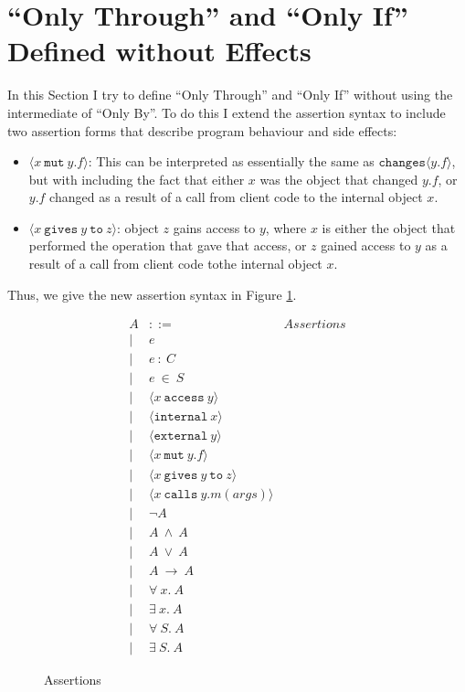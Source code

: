 \documentclass[12pt]{article}
\newcommand\mut[3]{#1\ \texttt{mut}\ #2.#3}
\newcommand\gives[3]{#1\ \texttt{gives}\ #2\ \texttt{to}\ #3}
\begin{document}
\section{``Only Through'' and ``Only If'' Defined without Effects}

In this Section I try to define ``Only Through'' and ``Only If'' without using the intermediate of ``Only By''.
To do this I extend the assertion syntax to include two assertion forms that describe program behaviour
and side effects:
\begin{itemize}
\item
$\langle \mut{x}{y}{f} \rangle$: 
This can be interpreted as essentially the same as $\texttt{changes}\langle y.f \rangle$, but with including the fact that either $x$ was the object that changed $y.f$, or $y.f$ 
changed as a result of a call from client code to the internal object $x$.
\item
$\langle \gives{x}{y}{z} \rangle$: object $z$ gains access to $y$, where $x$ is either the object that performed the operation that gave that access, or $z$ gained
access to $y$ as a result of a call from client code tothe internal object $x$.
\end{itemize}
Thus, we give the new assertion syntax in Figure \ref{f:assertions_triple2}.
	
	\begin{figure}[h]
	\[
	\begin{array}{llr}
	A & ::= & \textit{Assertions}\\  
	| & e & \\
	| & e\ :\ C & \\
	| & e\ \in\ S & \\
	| & \langle x\ \texttt{access}\ y \rangle &\\
	| & \langle \texttt{internal}\ x \rangle &\\
	| & \langle \texttt{external}\ y \rangle &\\
	| & \langle \mut x y f \rangle &\\
	| & \langle \gives x y z \rangle &\\
	| & \langle x\ \texttt{calls}\ y.m(args)\rangle & \\
	| & \neg A & \\
	| & A\ \wedge\ A & \\
	| & A\ \vee\ A & \\
	| & A\ \longrightarrow\ A & \\
	| & \forall\ x.\ A & \\
	| & \exists\ x.\ A & \\
	| & \forall\ S.\ A & \\
	| & \exists\ S.\ A &
	\end{array}
	\]
	\caption{Assertions}
	\label{f:assertions_triple2}
	\end{figure}
	
\end{document}
